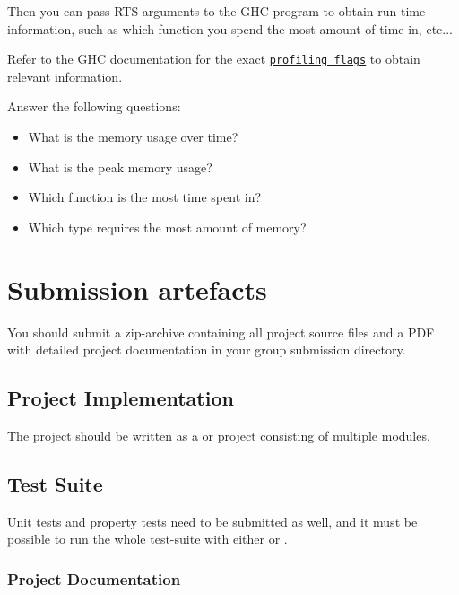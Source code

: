 \documentclass{article}
\begin{document}
Then you can pass RTS arguments to the GHC program to obtain run-time information, such as which function you spend the most amount of time in, etc...

Refer to the GHC documentation for the exact \href{https://downloads.haskell.org/ghc/latest/docs/html/users_guide/profiling.html#profiling-memory-usage}{\texttt{profiling flags}} to obtain relevant information.

Answer the following questions:

\begin{itemize}
\item What is the memory usage over time?
\item What is the peak memory usage?
\item Which function is the most time spent in?
\item Which type requires the most amount of memory?
\end{itemize}

\section{Submission artefacts}

You should submit a zip-archive containing all project source files and a PDF with detailed project documentation in your group submission directory.

\subsection{Project Implementation}

The project should be written as a  or  project consisting of multiple modules.

\subsection{Test Suite}

Unit tests and property tests need to be submitted as well, and it must be possible to run the whole test-suite with either  or .

\subsubsection*{Project Documentation}
\end{document}
